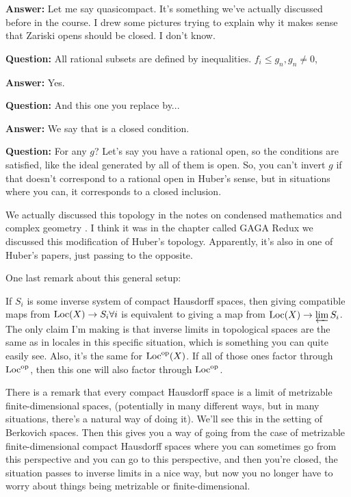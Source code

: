 \begin{example}
\textbf{Answer:} Let me say quasicompact. It's something we've actually discussed before in the course. I drew some pictures trying to explain why it makes sense that Zariski opens should be closed. I don't know.

\textbf{Question:} All rational subsets are defined by inequalities. $f_i \leq g_n, g_n \neq 0$, 

\textbf{Answer:} Yes.

\textbf{Question:} And this one you replace by...

\textbf{Answer:} We say that is a closed condition. 

\textbf{Question:} For any $g$? Let's say you have a rational open, so the conditions are satisfied, like the ideal generated by all of them  is open. So, you can't invert $g$ if that doesn't correspond to a rational open in Huber's sense, but in situations where you can, it corresponds to a closed inclusion.

We actually discussed this topology in the notes on condensed mathematics and complex geometry \cite{clausen2022condensed}. I think it was in the chapter called GAGA Redux we discussed this modification of Huber's topology. Apparently, it's also in one of Huber's papers, just passing to the opposite.

\begin{remark}
One last remark about this general setup: 

If $S_i$ is some inverse system of compact Hausdorff spaces, then giving compatible maps from $\operatorname{Loc}(X) \to S_i \forall i$ is equivalent to giving a map from $\operatorname{Loc}(X) \to \varprojlim S_i$. 
The only claim I'm making is that inverse limits in topological spaces are the same as in locales in this specific situation, which is something you can quite easily see. 
Also, it's the same for $\operatorname{Loc}^{\mathrm{op}}(X)$.  If all of those ones factor through $\operatorname{Loc}^{\mathrm{op}}$, then this one will also factor through $\operatorname{Loc}^{\mathrm{op}}$.

There is a remark that every compact Hausdorff space is a limit of metrizable finite-dimensional spaces, (potentially in many different ways, but in many situations, there's a natural way of doing it). We'll see this in the setting of Berkovich spaces. Then this gives you a way of going from the case of metrizable finite-dimensional compact Hausdorff spaces where you can sometimes go from this perspective  and you can go to this perspective, and then you're closed, the situation passes to inverse limits in a nice way, but now you no longer have to worry about things being metrizable or finite-dimensional.
\end{remark}


\end{example}
